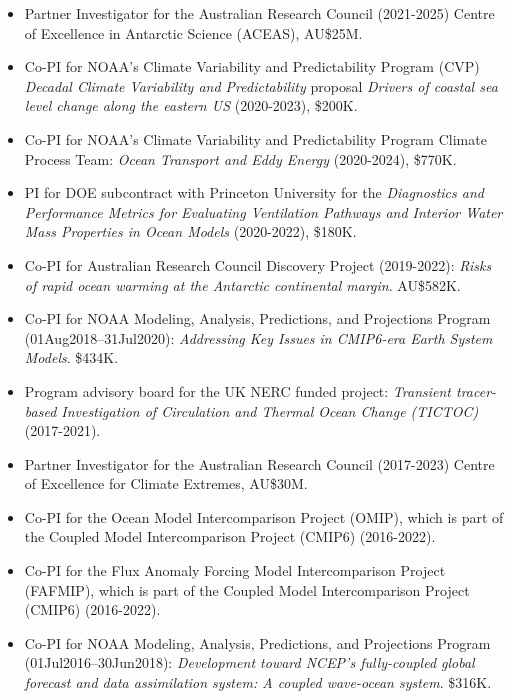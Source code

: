 \documentclass{article}
\begin{document}
\begin{itemize}[leftmargin=*]

\item Partner Investigator for the Australian Research Council (2021-2025) Centre of Excellence in Antarctic Science (ACEAS), AU\$25M.
  
\item Co-PI for NOAA's Climate Variability and Predictability Program (CVP) {\it Decadal Climate Variability and Predictability} proposal {\it Drivers of coastal sea level change along the eastern US} (2020-2023), \$200K.  

\item Co-PI for NOAA's Climate Variability and Predictability Program Climate Process Team: {\it Ocean Transport and Eddy Energy} (2020-2024), \$770K.

\item PI for DOE subcontract with Princeton University for the {\it Diagnostics and Performance Metrics for Evaluating Ventilation Pathways and Interior Water Mass Properties in Ocean Models} (2020-2022), \$180K. 

\item Co-PI for Australian Research Council Discovery Project (2019-2022): {\it Risks of rapid ocean warming at the Antarctic continental margin}. AU\$582K.

\item Co-PI for NOAA Modeling, Analysis, Predictions, and Projections Program (01Aug2018--31Jul2020): {\it Addressing Key Issues in CMIP6-era Earth System Models}. \$434K.
    
\item Program advisory board for the UK NERC funded project: {\it Transient tracer-based Investigation of Circulation and Thermal Ocean Change (TICTOC)} (2017-2021).

\item Partner Investigator for the Australian Research Council (2017-2023) Centre of Excellence for Climate Extremes, AU\$30M.
  
\item Co-PI for the Ocean Model Intercomparison Project (OMIP), which is part of the Coupled Model Intercomparison Project (CMIP6) (2016-2022).    

\item Co-PI for the Flux Anomaly Forcing Model Intercomparison Project (FAFMIP), which is part of the Coupled Model Intercomparison Project (CMIP6) (2016-2022).    

\item Co-PI for NOAA Modeling, Analysis, Predictions, and Projections Program (01Jul2016--30Jun2018): {\it Development toward NCEP's fully-coupled global forecast and data assimilation system: A coupled wave-ocean system}.  \$316K.


\end{itemize}
\end{document}
